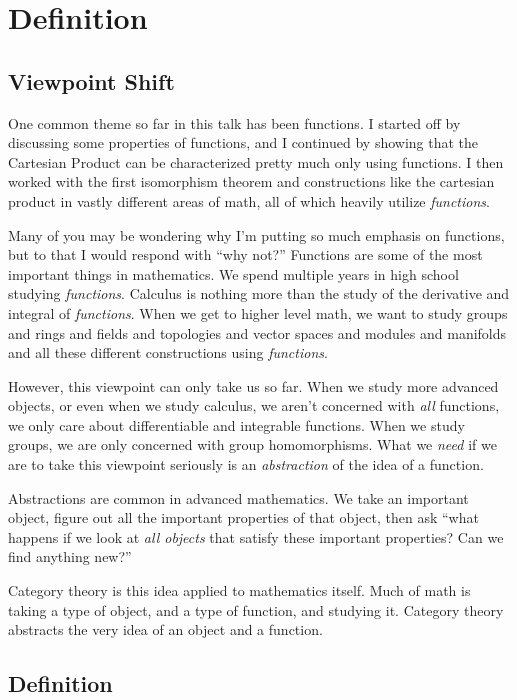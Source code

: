 \section{Definition}

\subsection{Viewpoint Shift}

One common theme so far in this talk has been functions. I started off by discussing some properties of functions, and I continued by showing that the Cartesian Product can be characterized pretty much only using functions. I then worked with the first isomorphism theorem and constructions like the cartesian product in vastly different areas of math, all of which heavily utilize \emph{functions}.

Many of you may be wondering why I'm putting so much emphasis on functions, but to that I would respond with ``why not?'' Functions are some of the most important things in mathematics. We spend multiple years in high school studying \emph{functions}. Calculus is nothing more than the study of the derivative and integral of \emph{functions}. When we get to higher level math, we want to study groups and rings and fields and topologies and vector spaces and modules and manifolds and all these different constructions using \emph{functions}.

However, this viewpoint can only take us so far. When we study more advanced objects, or even when we study calculus, we aren't concerned with \emph{all} functions, we only care about differentiable and integrable functions. When we study groups, we are only concerned with group homomorphisms. What we \emph{need} if we are to take this viewpoint seriously is an \emph{abstraction} of the idea of a function.

Abstractions are common in advanced mathematics. We take an important object, figure out all the important properties of that object, then ask ``what happens if we look at \emph{all objects} that satisfy these important properties? Can we find anything new?''

Category theory is this idea applied to mathematics itself. Much of math is taking a type of object, and a type of function, and studying it. Category theory abstracts the very idea of an object and a function.

\subsection{Definition}


